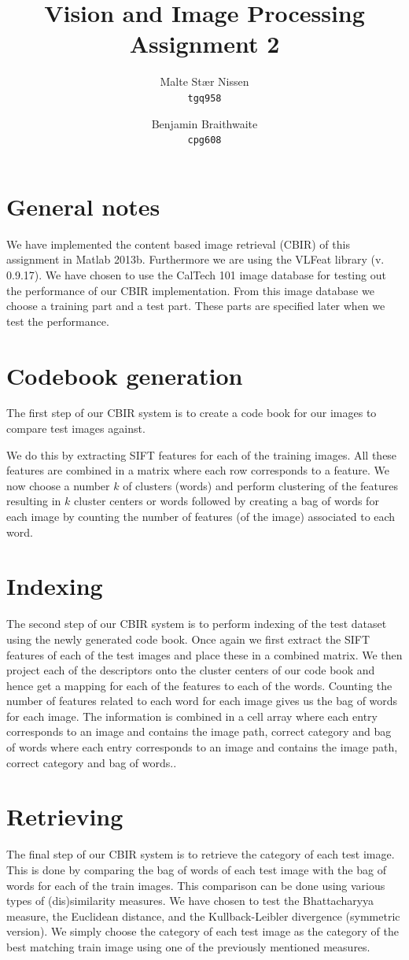 \documentclass[11pt,a4paper]{article}
\title{Vision and Image Processing\\Assignment 2}
\author{Malte Stær Nissen \\ \texttt{tgq958} \and Benjamin Braithwaite \\
\texttt{cpg608}}
\begin{document}
\maketitle

\section{General notes}
We have implemented the content based image retrieval (CBIR) of this assignment
in Matlab 2013b. Furthermore we are using the VLFeat library (v. 0.9.17). We
have chosen to use the CalTech 101 image database for testing out the
performance of our CBIR implementation. From this image database we choose a
training part and a test part. These parts are specified later when we test the
performance.

\section{Codebook generation}
The first step of our CBIR system is to create a code book for our images to
compare test images against.

We do this by extracting SIFT features for each of the training images. All
these features are combined in a matrix where each row corresponds to a
feature. We now choose a number $k$ of clusters (words) and perform clustering
of the features resulting in $k$ cluster centers or words followed by creating
a bag of words for each image by counting the number of features (of the image)
associated to each word.

\section{Indexing}
The second step of our CBIR system is to perform indexing of the test dataset
using the newly generated code book. Once again we first extract the SIFT
features of each of the test images and place these in a combined matrix. We
then project each of the descriptors onto the cluster centers of our code book
and hence get a mapping for each of the features to each of the words. Counting
the number of features related to each word for each image gives us the bag of
words for each image. The information is combined in a cell array where each
entry corresponds to an image and contains the image path, correct category and
bag of words where each entry corresponds to an image and contains the image
path, correct category and bag of words..

\section{Retrieving}
The final step of our CBIR system is to retrieve the category of each test
image. This is done by comparing the bag of words of each test image with the
bag of words for each of the train images. This comparison can be done using
various types of (dis)similarity measures. We have chosen to test the
Bhattacharyya measure, the Euclidean distance, and the
Kullback-Leibler divergence (symmetric version). We simply choose the category
of each test image as the category of the best matching train image using one of
the previously mentioned measures.
\end{document}
